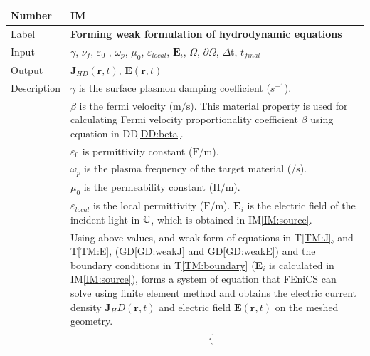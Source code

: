 \documentclass[12pt]{article}
\newcommand{\colBwidth}{0.82\textwidth} \newcommand{\colCwidth}{0.1\textwidth}
\newcounter{instnum} %
\begin{document}
	~\newline \noindent \begin{minipage}{\textwidth}
		\renewcommand*{\arraystretch}{1.5} \begin{tabular}{| p{\colAwidth} |
				p{\colBwidth}|} \hline \rowcolor[gray]{0.9} Number&
			IM{instnum}\theinstnum \label{IM:solve}\\ \hline Label& \bf
			Forming weak formulation of hydrodynamic equations\\ \hline Input& $\gamma$,
			$\nu_f$, $\varepsilon_0$ , $\omega_p$, $\mu_{0}$, $\varepsilon_{local}$,
			$\textbf{E}_i$, $\Omega$, $\partial \Omega$, $\Delta$t, $t_{final}$ \\ \hline
			Output&  $\textbf{J}_{HD}(\textbf{r},t)$, $\textbf{E}(\textbf{r},t)$ \\ \hline
			Description & $\gamma$ is the surface plasmon damping coefficient ($s^{-1}$).\\
			& $\beta$ is the fermi velocity ($\si{\meter \per \second}$). This material
			property is used for calculating Fermi velocity proportionality coefficient
			$\beta$ using equation in DD\ref{DD:beta}.\\ & $\varepsilon_{0}$ is
			permittivity constant ($\si{\farad \per \meter}$). \\ & $\omega_p$ is the
			plasma frequency of the target material ($\si{\per \second}$).\\ & $\mu_{0}$ is
			the permeability constant ($\si{\henry \per \meter}$). \\ &
			$\varepsilon_{local}$ is the local permittivity ($\si{\farad \per \meter}$).
			$\textbf{E}_i$ is the electric field of the incident light in $\Bbb C$, which
			is obtained in IM\ref{IM:source}. \\ & Using above values, and weak form of
			equations in T\ref{TM:J}, and T\ref{TM:E}, (GD\ref{GD:weakJ} and
			GD\ref{GD:weakE}) and the boundary conditions in T\ref{TM:boundary}
			(\textbf{E}$_i$ is calculated in IM\ref{IM:source}), forms a system of equation
			that FEniCS can solve using finite element method and obtains the electric
			current density $\textbf{J}_HD(\textbf{r},t)$ and electric field
			$\textbf{E}(\textbf{r},t)$ on the meshed geometry.\\
			
			&	\begin{equation} \label{eq:FEniCS} \begin{gathered} \begin{cases}
						

\end{cases}
\end{gathered}
\end{equation}
\end{tabular}
\end{minipage}
\end{document}
